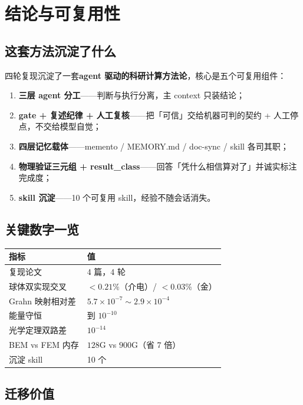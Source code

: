\section{结论与可复用性}

\subsection{这套方法沉淀了什么}

四轮复现沉淀了一套\textbf{agent 驱动的科研计算方法论}，核心是五个可复用组件：

\begin{enumerate}
  \item \textbf{三层 agent 分工}——判断与执行分离，主 context 只装结论；
  \item \textbf{gate + 复述纪律 + 人工复核}——把「可信」交给机器可判的契约 + 人工停点，不交给模型自觉；
  \item \textbf{四层记忆载体}——memento / MEMORY.md / doc-sync / skill 各司其职；
  \item \textbf{物理验证三元组 + result\_class}——回答「凭什么相信算对了」并诚实标注完成度；
  \item \textbf{skill 沉淀}——10 个可复用 skill，经验不随会话消失。
\end{enumerate}

\subsection{关键数字一览}

\begin{table}[H]
\centering\small
\begin{tabular}{@{}ll@{}}
\toprule
指标 & 值 \\
\midrule
复现论文 & 4 篇，4 轮 \\
球体双实现交叉 & $<0.21\%$（介电）/ $<0.03\%$（金） \\
Grahn 映射相对差 & $5.7\times10^{-7}\sim2.9\times10^{-4}$ \\
能量守恒 & 到 $10^{-10}$ \\
光学定理双路差 & $10^{-14}$ \\
BEM vs FEM 内存 & $128$G vs $900$G（省 7 倍） \\
沉淀 skill & 10 个 \\
\bottomrule
\end{tabular}
\end{table}

\subsection{迁移价值}

